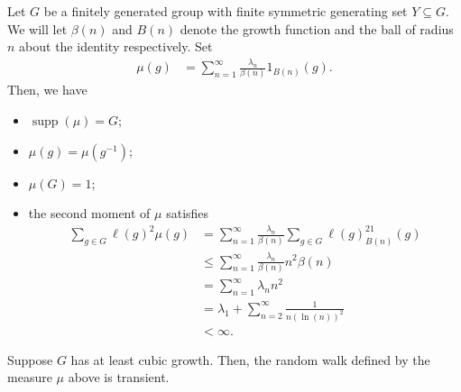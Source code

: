 \documentclass[10pt]{mypackage}
\begin{document}
Let $G$ be a finitely generated group with finite symmetric generating set $Y\subseteq G$. We will let $\beta(n)$ and $B(n)$ denote the growth function and the ball of radius $n$ about the identity respectively. Set
\begin{align*}
  \mu(g) &= \sum_{n=1}^{\infty} \frac{\lambda_n}{\beta(n)}1_{B(n)}(g).
\end{align*}
Then, we have 
\begin{itemize}
  \item $\operatorname{supp}\left( \mu \right) = G$;
  \item $\mu(g) = \mu\left( g^{-1} \right)$;
  \item $\mu(G) = 1$;
  \item the second moment of $\mu$ satisfies
    \begin{align*}
      \sum_{g\in G} \ell(g)^2\mu(g) &= \sum_{n=1}^{\infty} \frac{\lambda_n}{\beta(n)}\sum_{g\in G} \ell(g)^21_{B(n)}(g)\\
                                    &\leq \sum_{n=1}^{\infty} \frac{\lambda_n}{\beta(n)}n^2\beta(n)\\
                                    &= \sum_{n=1}^{\infty}\lambda_nn^2\\
                                    &= \lambda_1 + \sum_{n=2}^{\infty} \frac{1}{n\left( \ln(n) \right)^2}\\
                                    &< \infty.
    \end{align*}
\end{itemize}
\begin{proposition}
  Suppose $G$ has at least cubic growth. Then, the random walk defined by the measure $\mu$ above is transient.
\end{proposition}
\end{document}
